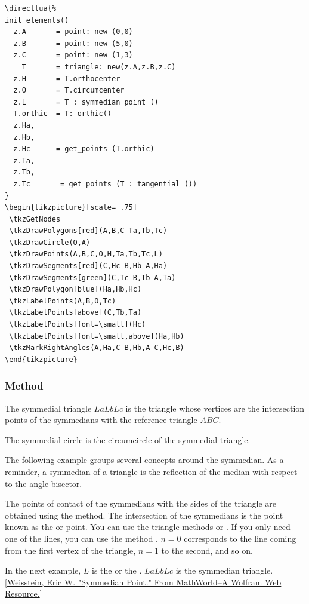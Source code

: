 \begin{Verbatim}
\directlua{%
init_elements()
  z.A       = point: new (0,0)
  z.B       = point: new (5,0)
  z.C       = point: new (1,3)
    T       = triangle: new(z.A,z.B,z.C)
  z.H       = T.orthocenter
  z.O       = T.circumcenter
  z.L       = T : symmedian_point ()
  T.orthic  = T: orthic()
  z.Ha,
  z.Hb,
  z.Hc      = get_points (T.orthic)
  z.Ta,
  z.Tb,
  z.Tc       = get_points (T : tangential ())
}
\begin{tikzpicture}[scale= .75]
 \tkzGetNodes
 \tkzDrawPolygons[red](A,B,C Ta,Tb,Tc)
 \tkzDrawCircle(O,A)
 \tkzDrawPoints(A,B,C,O,H,Ta,Tb,Tc,L)
 \tkzDrawSegments[red](C,Hc B,Hb A,Ha)
 \tkzDrawSegments[green](C,Tc B,Tb A,Ta)
 \tkzDrawPolygon[blue](Ha,Hb,Hc)
 \tkzLabelPoints(A,B,O,Tc)
 \tkzLabelPoints[above](C,Tb,Ta)
 \tkzLabelPoints[font=\small](Hc)
 \tkzLabelPoints[font=\small,above](Ha,Hb)
 \tkzMarkRightAngles(A,Ha,C B,Hb,A C,Hc,B)
\end{tikzpicture}
\end{Verbatim}




\subsubsection{Method } %
\label{ssub:method_imeth_triangle_symmedial}

The symmedial triangle $LaLbLc$  is the triangle whose vertices are the intersection points of the symmedians with the reference triangle $ABC$.

The symmedial circle is the circumcircle of the symmedial triangle.

The following example groups several concepts around the symmedian. As a reminder, a symmedian of a triangle is the reflection of the median with respect to the angle bisector.

The points of contact of the symmedians with the sides of the triangle are obtained using the  method.
The intersection of the symmedians is the point known as the  or  point.
You can use the triangle methods  or . If you only need one of the lines, you can use the method . \(n=0\) corresponds to the line coming from the first vertex of the triangle, \(n=1\) to the second, and so on.

In the next example, $L$ is the  or the . $LaLbLc$ is the symmedian triangle.[\href{https://mathworld.wolfram.com/SymmedianPoint.html}{Weisstein, Eric W. "Symmedian Point." From MathWorld--A Wolfram Web Resource.}]

